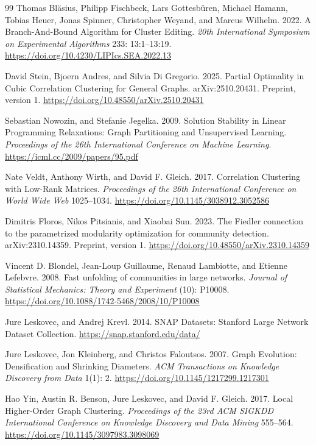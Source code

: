 \documentclass[sigconf,anonymous,review]{acmart}
\newcommand{\1}{\mathbf{1}}
\begin{document}
\begin{thebibliography}{99}
Thomas Bl{\"a}sius, Philipp Fischbeck, Lars Gottesb{\"u}ren, Michael Hamann, Tobias Heuer, Jonas Spinner, Christopher Weyand, and Marcus Wilhelm. 2022. A Branch-And-Bound Algorithm for Cluster Editing. \emph{20th International Symposium on Experimental Algorithms} 233: 13:1--13:19. \url{https://doi.org/10.4230/LIPIcs.SEA.2022.13}

David Stein, Bjoern Andres, and Silvia Di Gregorio. 2025. Partial Optimality in Cubic Correlation Clustering for General Graphs. arXiv:2510.20431. Preprint, version 1. \url{https://doi.org/10.48550/arXiv.2510.20431}

Sebastian Nowozin, and Stefanie Jegelka. 2009. Solution Stability in Linear Programming Relaxations: Graph Partitioning and Unsupervised Learning. \emph{Proceedings of the 26th International Conference on Machine Learning}. \url{https://icml.cc/2009/papers/95.pdf}

Nate Veldt, Anthony Wirth, and David F. Gleich. 2017. Correlation Clustering with Low-Rank Matrices. \emph{Proceedings of the 26th International Conference on World Wide Web} 1025--1034. \url{https://doi.org/10.1145/3038912.3052586}

Dimitris Floros, Nikos Pitsianis, and Xiaobai Sun. 2023. The Fiedler connection to the parametrized modularity optimization for community detection. arXiv:2310.14359. Preprint, version 1. \url{https://doi.org/10.48550/arXiv.2310.14359}

Vincent D. Blondel, Jean-Loup Guillaume, Renaud Lambiotte, and Etienne Lefebvre. 2008. Fast unfolding of communities in large networks. \emph{Journal of Statistical Mechanics: Theory and Experiment} (10): P10008. \url{https://doi.org/10.1088/1742-5468/2008/10/P10008}

Jure Leskovec, and Andrej Krevl. 2014. {SNAP Datasets}: {Stanford} Large Network Dataset Collection. \url{https://snap.stanford.edu/data/}

Jure Leskovec, Jon Kleinberg, and Christos Faloutsos. 2007. Graph Evolution: Densification and Shrinking Diameters. \emph{ACM Transactions on Knowledge Discovery from Data} 1(1): 2. \url{https://doi.org/10.1145/1217299.1217301}

Hao Yin, Austin R. Benson, Jure Leskovec, and David F. Gleich. 2017. Local Higher-Order Graph Clustering. \emph{Proceedings of the 23rd ACM SIGKDD International Conference on Knowledge Discovery and Data Mining} 555--564. \url{https://doi.org/10.1145/3097983.3098069}


\end{thebibliography}
\end{document}
